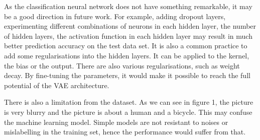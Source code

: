 \documentclass[11pt,a4paper]{report}
\begin{document}
As the classification neural network does not have something remarkable, it may be a good direction in future work. For example, adding dropout layers, experimenting different combinations of neurons in each hidden layer, the number of hidden layers, the activation function in each hidden layer may result in much better prediction accuracy on the test data set. It is also a common practice to add some regularisations into the hidden layers. It can be applied to the kernel, the bias or the output. There are also various regularisations, such as weight decay. By fine-tuning the parameters, it would make it possible to reach the full potential of the VAE architecture. 

There is also a limitation from the dataset. As we can see in figure 1, the picture is very blurry and the picture is about a human and a bicycle. This may confuse the machine learning model. Simple models are not resistant to noises or mislabelling in the training set, hence the performance would suffer from that.

\printbibliography[title={References}]
\end{document}
